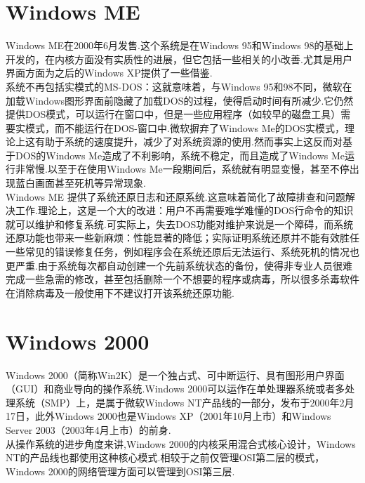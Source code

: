 \documentclass[a4paper,12pt,notitlepage]{article}
\begin{document}
\section{Windows ME}

	Windows ME在2000年6月发售.这个系统是在Windows 95和Windows 98的基础上开发的，在内核方面没有实质性的进展，但它包括一些相关的小改善.尤其是用户界面方面为之后的Windows XP提供了一些借鉴. \\
	
	系统不再包括实模式的MS-DOS：这就意味着，与Windows 95和98不同，微软在加载Windows图形界面前隐藏了加载DOS的过程，使得启动时间有所减少.它仍然提供DOS模式，可以运行在窗口中，但是一些应用程序（如较早的磁盘工具）需要实模式，而不能运行在DOS-窗口中.微软摒弃了Windows Me的DOS实模式，理论上这有助于系统的速度提升，减少了对系统资源的使用.然而事实上这反而对基于DOS的Windows Me造成了不利影响，系统不稳定，而且造成了Windows Me运行非常慢.以至于在使用Windows Me一段期间后，系统就有明显变慢，甚至不停出现蓝白画面甚至死机等异常现象. \\
	
	Windows ME 提供了系统还原日志和还原系统.这意味着简化了故障排查和问题解决工作.理论上，这是一个大的改进：用户不再需要难学难懂的DOS行命令的知识就可以维护和修复系统.可实际上，失去DOS功能对维护来说是一个障碍，而系统还原功能也带来一些新麻烦：性能显著的降低；实际证明系统还原并不能有效胜任一些常见的错误修复任务，例如程序会在系统还原后无法运行、系统死机的情况也更严重.由于系统每次都自动创建一个先前系统状态的备份，使得非专业人员很难完成一些急需的修改，甚至包括删除一个不想要的程序或病毒，所以很多杀毒软件在消除病毒及一般使用下不建议打开该系统还原功能. \\
	
\section{Windows 2000}

	Windows 2000（简称Win2K）是一个独占式、可中断运行、具有图形用户界面（GUI）和商业导向的操作系统.Windows 2000可以运作在单处理器系统或者多处理系统（SMP）上，是属于微软Windows NT产品线的一部分，发布于2000年2月17日，此外Windows 2000也是Windows XP（2001年10月上市）和Windows Server 2003（2003年4月上市）的前身. \\
	
	从操作系统的进步角度来讲,Windows 2000的内核采用混合式核心设计，Windows NT的产品线也都使用这种核心模式.相较于之前仅管理OSI第二层的模式，Windows 2000的网络管理方面可以管理到OSI第三层. \\
	
\end{document}
